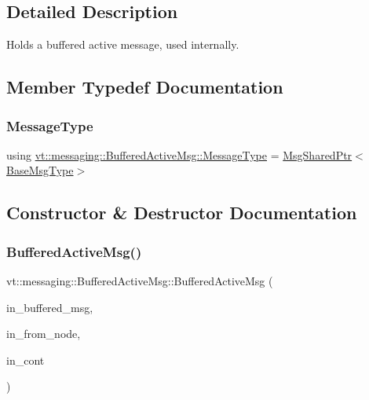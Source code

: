 \subsection{Detailed Description}
Holds a buffered active message, used internally. 

\subsection{Member Typedef Documentation}
\mbox{\label{structvt_1_1messaging_1_1_buffered_active_msg_a36c6d58d477907e916a251fb358f9154}} 
\subsubsection{\texorpdfstring{Message\+Type}{MessageType}}
{\footnotesize\ttfamily using \hyperlink{structvt_1_1messaging_1_1_buffered_active_msg_a36c6d58d477907e916a251fb358f9154}{vt\+::messaging\+::\+Buffered\+Active\+Msg\+::\+Message\+Type} =  \hyperlink{structvt_1_1messaging_1_1_msg_shared_ptr}{Msg\+Shared\+Ptr}$<$\hyperlink{namespacevt_a44d0d4e144748f2b19a1cfd962f50338}{Base\+Msg\+Type}$>$}



\subsection{Constructor \& Destructor Documentation}
\mbox{\label{structvt_1_1messaging_1_1_buffered_active_msg_a76b964a87805d59f20d0cbf861f546a2}} 
\subsubsection{\texorpdfstring{Buffered\+Active\+Msg()}{BufferedActiveMsg()}}
{\footnotesize\ttfamily vt\+::messaging\+::\+Buffered\+Active\+Msg\+::\+Buffered\+Active\+Msg (\begin{DoxyParamCaption}\item[{\hyperlink{structvt_1_1messaging_1_1_buffered_active_msg_a36c6d58d477907e916a251fb358f9154}{Message\+Type} const \&}]{in\+\_\+buffered\+\_\+msg,  }\item[{\hyperlink{namespacevt_a866da9d0efc19c0a1ce79e9e492f47e2}{Node\+Type} const \&}]{in\+\_\+from\+\_\+node,  }\item[{\hyperlink{namespacevt_ae0a5a7b18cc99d7b732cb4d44f46b0f3}{Action\+Type}}]{in\+\_\+cont }\end{DoxyParamCaption})\hspace{0.3cm}{\ttfamily [inline]}}



